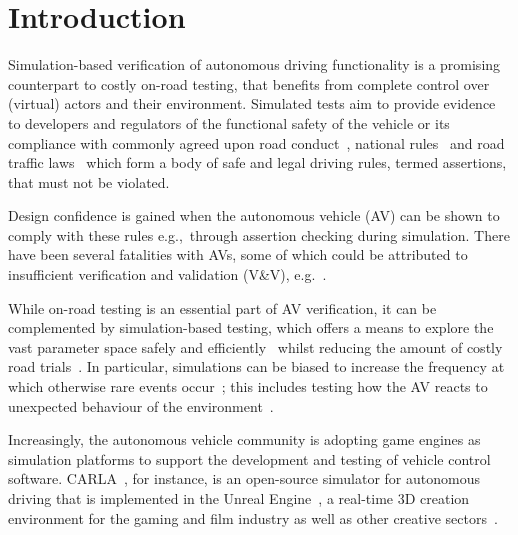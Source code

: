 \section{Introduction} \label{s:introduction}
Simulation-based verification of autonomous driving functionality is a promising counterpart to costly on-road testing, that benefits from complete control over (virtual) actors and their environment.
%
Simulated tests aim to provide evidence to developers and regulators of the functional safety of the vehicle or its compliance with commonly agreed upon road conduct~\cite{ViennaConv}, national rules~\cite{codes2015highway} and road traffic laws~\cite{RoadTraffic1988} which form a body of safe and legal driving rules, termed assertions, that must not be violated. 

Design confidence is gained when the autonomous vehicle (AV) can be shown to comply with these rules e.g.,\ through assertion checking during simulation. There have been several fatalities with AVs, some of which could be attributed to insufficient verification and validation (V\&V), e.g.~\cite{FatalityExample}. 

While on-road testing is an essential part of AV verification, it can be complemented by  simulation-based testing, which offers a means to explore the vast parameter space safely and efficiently~\cite{korosec2019waymo} whilst reducing the amount of costly road trials~\cite{kalra2016driving}.
%
In particular, simulations can be biased to increase the frequency at which otherwise rare events occur~\cite{Koopman2018}; this includes testing how the AV reacts to unexpected behaviour of the environment~\cite{RobustnessAutonomy}. 

Increasingly, the autonomous vehicle community is adopting game engines as simulation platforms to support the development and testing of vehicle control software. 
%
CARLA~\cite{carla_main_website}, for instance, is an open-source simulator for autonomous driving that is implemented in the Unreal Engine~\cite{UE4_main_website}, a real-time 3D creation environment for the gaming and film industry as well as other creative sectors~\cite{CARLA_paper}. 

